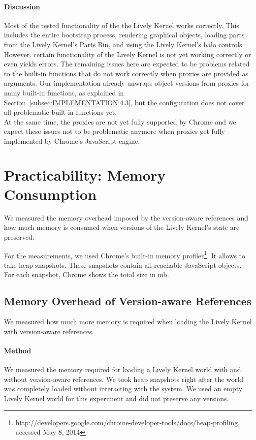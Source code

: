 \paragraph{Discussion}
Most of the tested functionality of the the Lively Kernel works correctly.
This includes the entire bootstrap process, rendering graphical objects, loading parts from the Lively Kernel's Parts Bin, and using the Lively Kernel's halo controls.
However, certain functionality of the Lively Kernel is not yet working correctly or even yields errors.
The remaining issues here are expected to be problems related to the built-in functions that do not work correctly when proxies are provided as arguments.
Our implementation already unwraps object versions from proxies for many built-in functions, as explained in Section~\ref{subsec:IMPLEMENTATION:4.3}, but the configuration does not cover all problematic built-in functions yet.\\
At the same time, the proxies are not yet fully supported by Chrome and we expect these issues not to be problematic anymore when proxies get fully implemented by Chrome's JavaScript engine.\\



\section{Practicability: Memory Consumption} \label{sec:EVALUATION:3}

We measured the memory overhead imposed by the version-aware references and how much memory is consumed when versions of the Lively Kernel's state are preserved.

For the measurements, we used Chrome's built-in memory profiler\footnote{\url{http://developers.google.com/chrome-developer-tools/docs/heap-profiling}, accessed May 8, 2014}.
It allows to take heap snapshots.
These snapshots contain all reachable JavaScript objects.
For each snapshot, Chrome shows the total size in \ac{mb}.

\subsection{Memory Overhead of Version-aware References}

We measured how much more memory is required when loading the Lively Kernel with version-aware references.

\paragraph{Method}
We measured the memory required for loading a Lively Kernel world with and without version-aware references.
We took heap snapshots right after the world was completely loaded without interacting with the system.
We used an empty Lively Kernel world for this experiment and did not preserve any versions.

